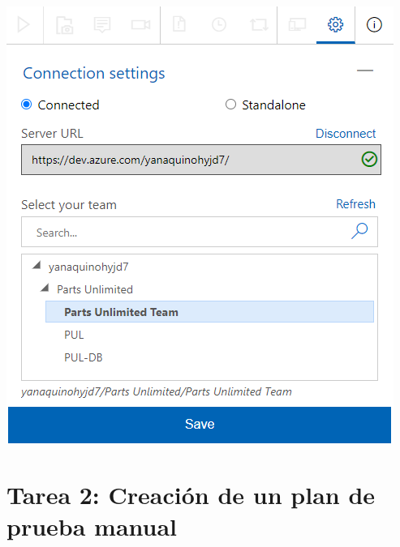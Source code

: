 \begin{itemize}
\begin{center}
\includegraphics[width=\columnwidth]{images/23}\newline
\end{center} 

\end{itemize}

\section{Tarea 2: Creación de un plan de prueba manual } 

